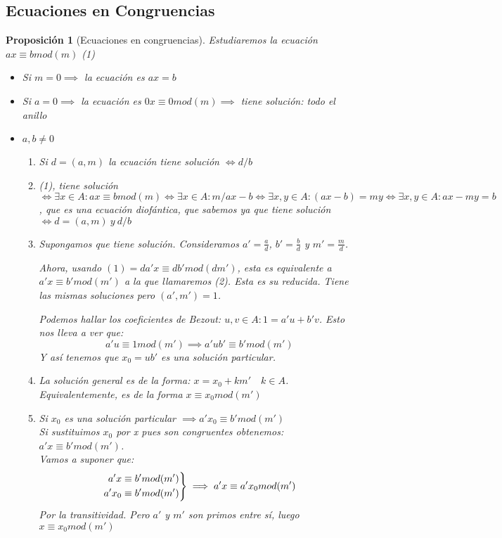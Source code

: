 \documentclass[11pt, a4paper, titlepage]{article}
\makeatletter
\renewenvironment{proof}[1][\proofname] {\vspace{-15pt}\par\pushQED{\qed}\normalfont\topsep6\p@\@plus6\p@\relax\trivlist\item[\hskip\labelsep\it#1\@addpunct{.}]\ignorespaces}{\popQED\endtrivlist\@endpefalse}
\theoremstyle{theorem-style}
\newtheorem*{nprop}{Proposición}
\theoremstyle{definition-style}
\theoremstyle{remark-style}
\theoremstyle{example-style}
\newenvironment{rcases}
  {\left.\begin{aligned}}
  {\end{aligned}\right\rbrace}
\makeatother
\begin{document}
\subsection{Ecuaciones en Congruencias}
\begin{nprop}[Ecuaciones en congruencias]

Estudiaremos la ecuación $ax \equiv b mod(m)$ (1)
\begin{itemize}
	\item Si $m = 0 \implies$ la ecuación es $ax = b$
	\item Si $a = 0\implies $ la ecuación es $0x \equiv 0 mod(m) \implies$ tiene solución: todo el anillo
	\item $a,b \ne 0$
	\begin{enumerate}
	
	\item Si $d = (a,m)$ la ecuación tiene solución $\iff  d/b$\\
	\begin{proof}
	(1), tiene solución $\iff \exists x \in A : ax \equiv bmod(m) \iff \exists x \in A : m/ax-b \iff \exists x,y \in A : (ax-b) = my \iff \exists x,y \in A: ax -my  = b$, que es una ecuación diofántica, que sabemos ya que tiene solución $\iff d =(a,m) \ y  \ d/b$
\end{proof}
	\item  Supongamos que tiene solución. Consideramos $a'= \frac{a}{d}$, $b'= \frac{b}{d}$ y $m' = \frac{m}{d}$.
	
	Ahora, usando $(1) = da'x \equiv db'mod(dm')$, esta es equivalente a $a'x \equiv b' mod(m')$ a la que llamaremos (2). Esta es su reducida. Tiene las mismas soluciones pero $(a',m') = 1$.
	
	Podemos hallar los coeficientes de Bezout: $u,v \in A :  1 = a'u + b'v$. Esto nos lleva a ver que:
	\[
	a'u \equiv 1 mod(m') \implies a'ub' \equiv b' mod(m')
	\]
	Y así tenemos que $x_0 = ub'$ es una solución particular.
	
	\item La solución general es de la forma: $x = x_0 +km' \quad k \in A$. Equivalentemente, es de la forma $x \equiv x_0 mod(m')$\\
	\begin{proof}
	Si $x_0$ es una solución particular $\implies a'x_0 \equiv b'mod(m')$\\
	Si sustituimos $x_0$ por x pues son congruentes obtenemos: $a'x \equiv b' mod(m')$.\\
	Vamos a suponer que:
	\[
	\begin{rcases}
	a'x \equiv b' mod(m')\\
	a' x_0 \equiv b' mod(m')
\end{rcases} \implies a'x \equiv a'x_0 mod(m')
	\]
Por la transitividad. Pero $a'$ y $m'$ son primos entre sí, luego $x \equiv x_0 mod(m')$
\end{proof}


\end{enumerate}
\end{itemize}
\end{nprop}
\end{document}
